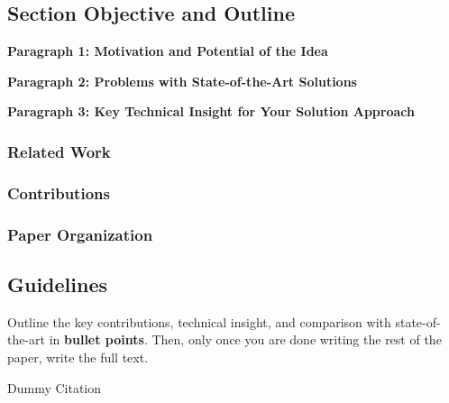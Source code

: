 \subsection{Section Objective and Outline}

\textbf{Paragraph 1: Motivation and Potential of the Idea}

\textbf{Paragraph 2: Problems with State-of-the-Art Solutions}

\textbf{Paragraph 3: Key Technical Insight for Your Solution Approach}

\subsubsection{Related Work}

\subsubsection{Contributions }

\subsubsection{Paper Organization }

\subsection{Guidelines}
Outline the key contributions, technical insight, and comparison with state-of-the-art in \textbf{bullet points}. Then, only once you are done writing the rest of the paper, write the full text.

Dummy Citation \cite{alvar2019multi}
